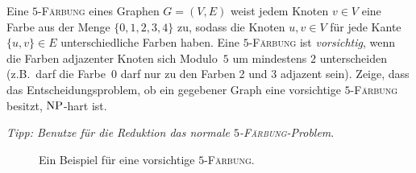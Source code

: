 \documentclass{uebung_cs}
\begin{document}
\begin{aufgabe}[\emoji{star}: Vorsichtige Färbung]
	Eine $5$-\textsc{Färbung} eines Graphen $G = (V,E)$ weist jedem Knoten $v \in V$ eine Farbe aus der Menge $\{0,1,2,3,4\}$ zu, sodass die Knoten $u,v \in V$ für jede Kante $\{u,v\} \in E$ unterschiedliche Farben haben. Eine $5$-\textsc{Färbung} ist \textit{vorsichtig}, wenn die Farben adjazenter Knoten sich Modulo~$5$ um mindestens $2$ unterscheiden (z.B.~darf die Farbe~0 darf nur zu den Farben 2 und 3 adjazent sein). Zeige, dass das Entscheidungsproblem, ob ein gegebener Graph eine vorsichtige $5$-\textsc{Färbung} besitzt, $\mathrm{NP}$-hart ist.
	
	\textit{Tipp: Benutze für die Reduktion das normale $5$-\textsc{Färbung}-Problem}.
	
	\begin{figure}[ht]
	\begin{center}
        \caption{Ein Beispiel für eine vorsichtige $5$-\textsc{Färbung}.}
	\end{center}
	\end{figure}
\end{aufgabe}
\end{document}
